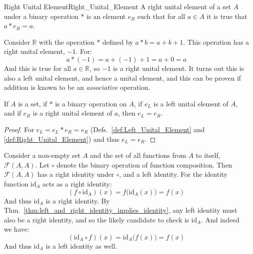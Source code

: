     \begin{fdefinition}{Right Unital Element}{Right_Unital_Element}
        A right unital element of a \gls{set} $A$ under a \gls{binary operation}
        $*$ is an element $e_{R}$ such that for all $a\in{A}$ it is true that
        $a*e_{R}=a$.
    \end{fdefinition}
    \begin{example}
        Consider $\mathbb{R}$ with the operation $*$ defined by $a*b=a+b+1$.
        This operation has a right unital element, $\minus{1}$. For:
        \begin{equation}
            a*(\minus{1})=a+(\minus{1})+1=a+0=a
        \end{equation}
        And this is true for all $a\in\mathbb{R}$, so $\minus{1}$ is a right
        unital element. It turns out this is also a left unital element, and
        hence a unital element, and this can be proven if addition is known to
        be an \textit{associative} operation.
    \end{example}
    \begin{theorem}
        \label{thm:left_and_right_identity_implies_identity}%
        If $A$ is a set, if $*$ is a binary operation on $A$, if $e_{L}$ is a
        left unital element of $A$, and if $e_{R}$ is a right unital element of
        $a$, then $e_{L}=e_{R}$.
    \end{theorem}
    \begin{proof}
        For $e_{L}=e_{L}*e_{R}=e_{R}$
        (Defs.~\ref{def:Left_Unital_Element} and \ref{def:Right_Unital_Element})
        and thus $e_{L}=e_{R}$.
    \end{proof}
    \begin{example}
        Consider a non-empty set $A$ and the set of all functions from $A$ to
        itself, $\mathcal{F}(A,A)$. Let $\circ$ denote the binary operation of
        function composition. Then $\mathcal{F}(A,A)$ has a right identity under
        $\circ$, and a left identity. For
        the identity function $\textrm{id}_{A}$ acts as a right identity:
        \begin{equation}
            (f\circ\textrm{id}_{A})(x)
            =f\big(\textrm{id}_{A}(x)\big)
            =f(x)
        \end{equation}
        And thus $\textrm{id}_{A}$ is a right identity. By
        Thm.~\ref{thm:left_and_right_identity_implies_identity}, any left
        identity must also be a right identity, and so the likely candidate to
        check is $\textrm{id}_{A}$. And indeed we have:
        \begin{equation}
            (\textrm{id}_{A}\circ{f})(x)
            =\textrm{id}_{A}\big(f(x)\big)
            =f(x)
        \end{equation}
        And thus $\textrm{id}_{A}$ is a left identity as well.
    \end{example}
